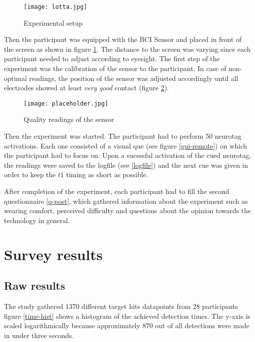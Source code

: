            \begin{figure}[h]     %
                \centering
                \texttt{[image: lotta.jpg]} 
                \caption{Experimental setup}\label{experimental-setup}
            \end{figure}            

            Then the participant was equipped with the BCI Sensor and placed in front of the screen as shown in figure \ref*{experimental-setup}. The distance to the screen was varying since each participant needed to adjust according to eyesight. The first step of the experiment was the calibration of the sensor to the participant. In case of non-optimal readings, the position of the sensor was adjusted accordingly until all electrodes showed at least \textit{very good} contact (figure \ref*{electrode-quality}).

            \begin{figure}[h]     %
                \centering
                \texttt{[image: placeholder.jpg]} 
                \caption{Quality readings of the sensor}\label{electrode-quality}
            \end{figure}

            Then the experiment was started. The participant had to perform 50 neurotag activations. Each one consisted of a visual que (see figure \ref*{gui-remote}) on which the participant had to focus on. Upon a sucessful activation of the cued neurotag, the readings were saved to the logfile (see \ref*{logfile}) and the next cue was given in order to keep the $t1$ timing as short as possible.

            After completion of the experiment, each participant had to fill the second questionnaire \ref*{q-post}, which gathered information about the experiment such as wearing comfort, perceived difficulty and questions about the opinion towards the technology in general. 

    \chapter{Survey results}

        \section{Raw results}

            The study gathered 1370 different target hits datapoints from 28 participants figure \ref*{time-hist} shows a histogram of the achieved detection times. The y-axis is scaled logarithmically because approximately 870 out of all detections were made in under three seconds. 

